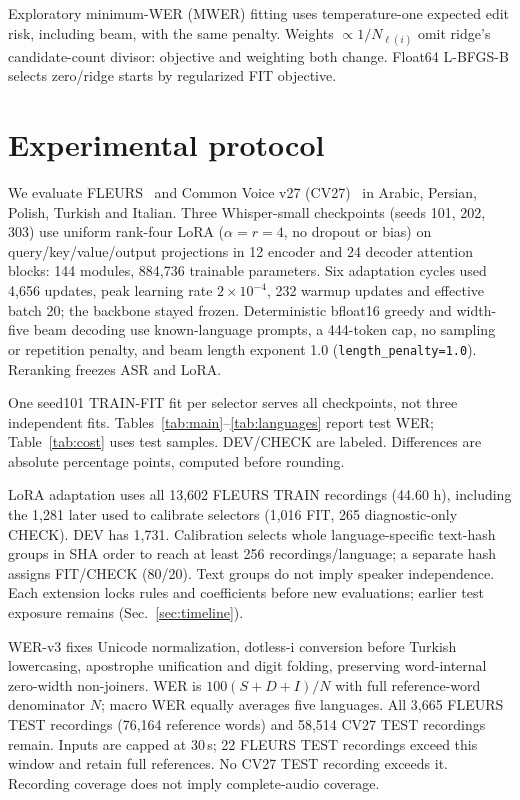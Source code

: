 \documentclass{article}
\begin{document}
Exploratory minimum-WER (MWER) fitting uses temperature-one expected edit risk, including beam, with the same penalty. Weights $\propto1/N_{\ell(i)}$ omit ridge's candidate-count divisor: objective and weighting both change. Float64 L-BFGS-B selects zero/ridge starts by regularized FIT objective.

\section{Experimental protocol}
We evaluate FLEURS~\cite{fleurs} and Common Voice v27 (CV27)~\cite{cv,cv27data} in Arabic, Persian, Polish, Turkish and Italian. Three Whisper-small checkpoints (seeds 101, 202, 303) use uniform rank-four LoRA ($\alpha{=}r{=}4$, no dropout or bias) on query/key/value/output projections in 12 encoder and 24 decoder attention blocks: 144 modules, 884{,}736 trainable parameters. Six adaptation cycles used 4{,}656 updates, peak learning rate $2\times10^{-4}$, 232 warmup updates and effective batch 20; the backbone stayed frozen. Deterministic bfloat16 greedy and width-five beam decoding use known-language prompts, a 444-token cap, no sampling or repetition penalty, and beam length exponent 1.0 (\texttt{length\_penalty=1.0}). Reranking freezes ASR and LoRA.

One seed101 TRAIN-FIT fit per selector serves all checkpoints, not three independent fits. Tables~\ref{tab:main}--\ref{tab:languages} report test WER; Table~\ref{tab:cost} uses test samples. DEV/CHECK are labeled. Differences are absolute percentage points, computed before rounding.

LoRA adaptation uses all 13{,}602 FLEURS TRAIN recordings (44.60 h), including the 1{,}281 later used to calibrate selectors (1{,}016 FIT, 265 diagnostic-only CHECK). DEV has 1{,}731. Calibration selects whole language-specific text-hash groups in SHA order to reach at least 256 recordings/language; a separate hash assigns FIT/CHECK (80/20). Text groups do not imply speaker independence. Each extension locks rules and coefficients before new evaluations; earlier test exposure remains (Sec.~\ref{sec:timeline}).

WER-v3 fixes Unicode normalization, dotless-i conversion before Turkish lowercasing, apostrophe unification and digit folding, preserving word-internal zero-width non-joiners. WER is $100(S+D+I)/N$ with full reference-word denominator $N$; macro WER equally averages five languages. All 3{,}665 FLEURS TEST recordings (76{,}164 reference words) and 58{,}514 CV27 TEST recordings remain. Inputs are capped at 30\,s; 22 FLEURS TEST recordings exceed this window and retain full references. No CV27 TEST recording exceeds it. Recording coverage does not imply complete-audio coverage.
\end{document}
